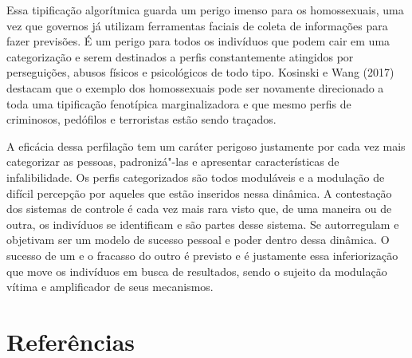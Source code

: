 Essa tipificação algorítmica guarda um perigo imenso para os
homossexuais, uma vez que governos já utilizam ferramentas faciais de
coleta de informações para fazer previsões. É um perigo para todos os
indivíduos que podem cair em uma categorização e serem destinados a
perfis constantemente atingidos por perseguições, abusos físicos e
psicológicos de todo tipo. Kosinski e Wang (2017) destacam que o exemplo
dos homossexuais pode ser novamente direcionado a toda uma tipificação
fenotípica marginalizadora e que mesmo perfis de criminosos, pedófilos e
terroristas estão sendo traçados.

A eficácia dessa perfilação tem um caráter perigoso justamente por cada
vez mais categorizar as pessoas, padronizá"-las e apresentar
características de infalibilidade. Os perfis categorizados são todos
moduláveis e a modulação de difícil percepção por aqueles que estão
inseridos nessa dinâmica. A contestação dos sistemas de controle é cada
vez mais rara visto que, de uma maneira ou de outra, os indivíduos se
identificam e são partes desse sistema. Se autorregulam e objetivam ser
um modelo de sucesso pessoal e poder dentro dessa dinâmica. O sucesso de
um e o fracasso do outro é previsto e é justamente essa inferiorização
que move os indivíduos em busca de resultados, sendo o sujeito da
modulação vítima e amplificador de seus mecanismos.

\section{Referências}

